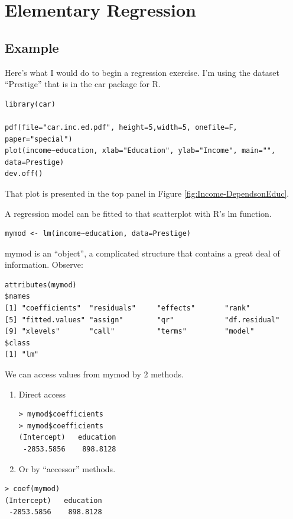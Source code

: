 
\chapter{Elementary Regression}


\section{Example}

Here's what I would do to begin a regression exercise. I'm using the
dataset ``Prestige'' that is in the car package for R.

\begin{lstlisting}[breaklines=true]
library(car)

pdf(file="car.inc.ed.pdf", height=5,width=5, onefile=F, paper="special")
plot(income~education, xlab="Education", ylab="Income", main="", data=Prestige)
dev.off()
\end{lstlisting}

That plot is presented in the top panel in Figure \ref{fig:Income-DependsonEduc}. 

A regression model \citet{gelman_bayesian_2003}can be fitted to that
scatterplot with R's lm function.

\begin{lstlisting}
mymod <- lm(income~education, data=Prestige)
\end{lstlisting}

mymod is an ``object'', a complicated structure that contains a
great deal of information. Observe:

\begin{lstlisting}
attributes(mymod)
$names  
[1] "coefficients"  "residuals"     "effects"       "rank"           
[5] "fitted.values" "assign"        "qr"            "df.residual"    
[9] "xlevels"       "call"          "terms"         "model"        
$class 
[1] "lm" 
\end{lstlisting}

We can access values from mymod by 2 methods. 
\begin{enumerate}
\item Direct access 


\begin{lstlisting}
> mymod$coefficients
> mymod$coefficients
(Intercept)   education 
 -2853.5856    898.8128 
\end{lstlisting}

\item Or by ``accessor'' methods.
\end{enumerate}
\begin{lstlisting}
> coef(mymod)
(Intercept)   education 
 -2853.5856    898.8128 
\end{lstlisting}

